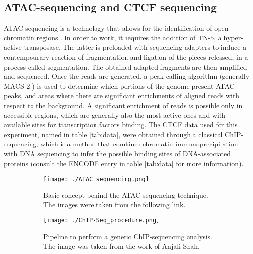 \subsection{ATAC-sequencing and CTCF sequencing}
ATAC-sequencing is a technology that allows for the identification of open chromatin regions 
\cite{buenrostroTranspositionNativeChromatin2013a, grandiChromatinAccessibilityProfiling2022}. 
In order to work, it requires the addition of TN-5, a hyper-active transposase. The latter is preloaded with sequencing adapters
\cite{grandiChromatinAccessibilityProfiling2022}
to induce a contempourary reaction of fragmentation and ligation of the pieces released, in a process called segmentation. The obtained adapted fragments are then amplified and sequenced. Once the reads are generated, a peak-calling algorithm (generally MACS-2 
\cite{zhangModelbasedAnalysisChIPSeq2008a}) 
is used to determine which portions of the genome present ATAC peaks, and areas where there are significant enrichments of aligned reads with respect to the background. A significant enrichment of reads is possible only in accessible regions, which are generally also the most active ones and with available sites for transcription factors binding. The CTCF data used for this experiment, named in table \ref{tab:data}, were obtained through a classical ChIP-sequencing, which is a method that combines chromatin immunoprecipitation with DNA sequencing to infer the possible binding sites of DNA-associated proteins (consult the ENCODE entry in table \ref{tab:data} for more information).


\begin{figure}[H]
    \centering
    
    \begin{subfigure}{0.69\textwidth}
      \texttt{[image: ./ATAC\_sequencing.png]}
      \caption{Basic concept behind the ATAC-sequencing technique. The images were taken from the following \href{https://www.activemotif.com/catalog/1233/atac-seq-service}{link}.}
      \label{fig: ATAC-sequencing}
    \end{subfigure}
    \hfill
    \begin{subfigure}{0.30\textwidth}
      \texttt{[image: ./ChIP-Seq\_procedure.png]}
      \caption{Pipeline to perform a generic ChIP-sequencing analysis. The image was taken from the work of Anjali Shah\cite{shahChromatinImmunoprecipitationSequencing2009}.}
      \label{fig: CTCF ChIP-Seq}
    \end{subfigure}
  
    \caption{}
\end{figure}
